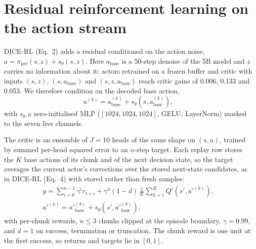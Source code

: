 \documentclass[10pt,twocolumn]{article}
\begin{document}
\section{Residual reinforcement learning on the action stream}

DICE-RL (Eq.~2) adds a residual conditioned on the action noise, $a = \pi_{\mathrm{pre}}(s, z) + s_\theta(s, z)$. Here $a_{\mathrm{base}}$ is a 50-step denoise of the 5B model and $z$ carries no information about it: actors retrained on a frozen buffer and critic with inputs $(s, z)$, $(s, a_{\mathrm{base}})$ and $(s, z, a_{\mathrm{base}})$ reach critic gains of 0.006, 0.133 and 0.053. We therefore condition on the decoded base action,
\begin{equation}
a^{(k)} = a^{(k)}_{\mathrm{base}} + s_\theta\!\left(s, a^{(k)}_{\mathrm{base}}\right),
\label{eq:residual}
\end{equation}
with $s_\theta$ a zero-initialised MLP ($[1024, 1024, 1024]$, GELU, LayerNorm) masked to the seven live channels.

The critic is an ensemble of $J = 10$ heads of the same shape on $(s, a)$, trained by summed per-head squared error to an $n$-step target. Each replay row stores the $K$ base actions of its chunk and of the next decision state, so the target averages the current actor's corrections over the stored next-state candidates, as in DICE-RL (Eq.~4) with stored rather than fresh samples:
\begin{equation}
\begin{split}
y = \sum_{i=0}^{n-1} \gamma^{i} r_{t+i} + \gamma^{n} (1 - d)\, \frac{1}{K} \sum_{k=1}^{K} Q'\!\left(s', a'^{(k)}\right), \\
a'^{(k)} = a'^{(k)}_{\mathrm{base}} + s_\theta\!\left(s', a'^{(k)}_{\mathrm{base}}\right),
\end{split}
\label{eq:target}
\end{equation}
with per-chunk rewards, $n \le 3$ chunks clipped at the episode boundary, $\gamma = 0.99$, and $d = 1$ on success, termination or truncation. The chunk reward is one unit at the first success, so returns and targets lie in $[0, 1]$.
\end{document}
